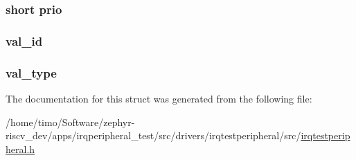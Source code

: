 \subsubsection[{\texorpdfstring{prio}{prio}}]{\setlength{\rightskip}{0pt plus 5cm}short prio}\hypertarget{struct_drv_event_adcd29556d7e74ba2cb03422da6683017}{}\label{struct_drv_event_adcd29556d7e74ba2cb03422da6683017}
\subsubsection[{\texorpdfstring{val\+\_\+id}{val_id}}]{ val\+\_\+id}\hypertarget{struct_drv_event_aae5ff1cc4fe7007a28ec8c8e7ad7fcad}{}\label{struct_drv_event_aae5ff1cc4fe7007a28ec8c8e7ad7fcad}
\subsubsection[{\texorpdfstring{val\+\_\+type}{val_type}}]{ val\+\_\+type}\hypertarget{struct_drv_event_a7f525ede95582d630aa5071200d67e74}{}\label{struct_drv_event_a7f525ede95582d630aa5071200d67e74}


The documentation for this struct was generated from the following file\+:\begin{DoxyCompactItemize}
\item 
/home/timo/\+Software/zephyr-\/riscv\+\_\+dev/apps/irqperipheral\+\_\+test/src/drivers/irqtestperipheral/src/\hyperlink{irqtestperipheral_8h}{irqtestperipheral.\+h}\end{DoxyCompactItemize}
